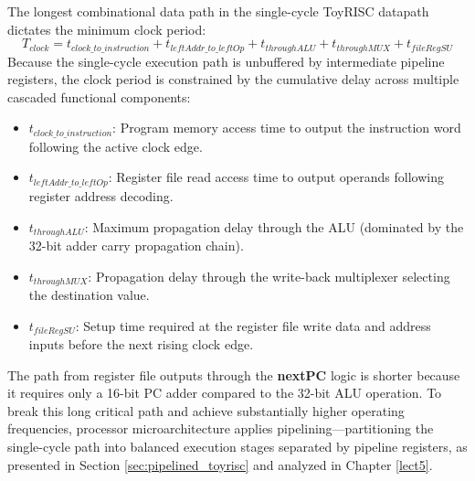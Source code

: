 The longest combinational data path in the single-cycle ToyRISC datapath dictates the minimum clock period:
\begin{equation}
T_{clock} = t_{clock\_to\_instruction} + t_{leftAddr\_to\_leftOp} + t_{throughALU} + t_{throughMUX} + t_{fileRegSU}
\end{equation}
Because the single-cycle execution path is unbuffered by intermediate pipeline registers, the clock period is constrained by the cumulative delay across multiple cascaded functional components:
\begin{itemize}
    \item $t_{clock\_to\_instruction}$: Program memory access time to output the instruction word following the active clock edge.
    \item $t_{leftAddr\_to\_leftOp}$: Register file read access time to output operands following register address decoding.
    \item $t_{throughALU}$: Maximum propagation delay through the ALU (dominated by the 32-bit adder carry propagation chain).
    \item $t_{throughMUX}$: Propagation delay through the write-back multiplexer selecting the destination value.
    \item $t_{fileRegSU}$: Setup time required at the register file write data and address inputs before the next rising clock edge.
\end{itemize}

The path from register file outputs through the \textbf{nextPC} logic is shorter because it requires only a 16-bit PC adder compared to the 32-bit ALU operation. To break this long critical path and achieve substantially higher operating frequencies, processor microarchitecture applies pipelining—partitioning the single-cycle path into balanced execution stages separated by pipeline registers, as presented in Section \ref{sec:pipelined_toyrisc} and analyzed in Chapter \ref{lect5}.